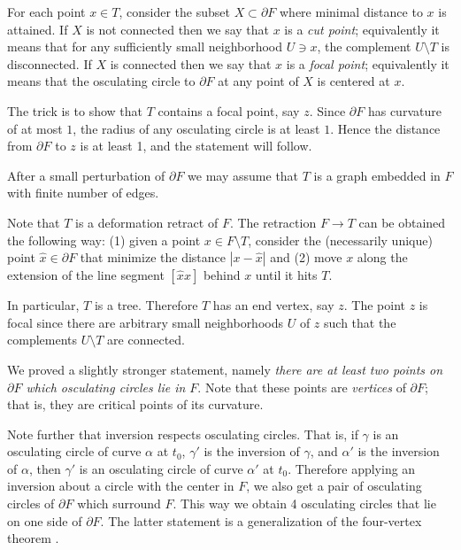 For each point $x\in T$, consider the subset $X\subset\partial F$ where minimal distance to $x$ is attained.
If $X$ is not connected then we say that $x$ is a \emph{cut point};
equivalently it means that for any sufficiently small neighborhood $U\ni x$, 
the complement $U\setminus T$ is disconnected.
If $X$ is connected 
then we say that $x$ is a \emph{focal point};
equivalently it means that the osculating circle to $\partial F$ at any point of $X$ is centered at $x$.

The trick is to show that $T$ contains a focal point, say $z$.
Since $\partial F$ has curvature of at most $1$, the radius of any osculating circle is at least $1$.
Hence the distance from $\partial F$ to $z$ is at least 1,
and the statement will follow.

\medskip

After a small perturbation
of $\partial F$ we may assume that
$T$ is a graph embedded in
$F$ with finite number of edges.

Note that $T$ is a
deformation retract of $F$.
The retraction $F\to T$ can be obtained the following way:
(1) given a point $x\in F\setminus T$,
consider the (necessarily unique) point $\hat x\in \partial F$ that minimize the distance $|x-\hat x|$ and
(2) move $x$ along the extension of the line segment $[\hat x x]$ behind $x$ until it hits $T$.

In particular, $T$ is a tree.
Therefore $T$ has
an end vertex, say $z$.
The point $z$ is focal since there are arbitrary small neighborhoods $U$ of $z$ such that the complements $U\setminus T$ are connected.
\qeds

We proved a slightly stronger statement, namely \textit{there are at least two points on $\partial F$ which osculating circles lie in $F$}.
Note that these points are \emph{vertices} of $\partial F$;
that is, they are critical points of its curvature.

Note further that inversion respects osculating circles.
That is, if $\gamma$ is an osculating circle of curve $\alpha$ at $t_0$,
$\gamma'$ is the inversion of $\gamma$, and 
$\alpha'$ is the inversion of $\alpha$,
then $\gamma'$ is an osculating circle of curve $\alpha'$ at $t_0$.
Therefore applying an inversion about a circle with the center in $F$, we also get a pair of osculating circles of $\partial F$ which surround $F$.
This way we obtain 4 osculating circles that lie on one side of $\partial F$.
The latter statement is a generalization of the four-vertex theorem \cite{petrunin-zamora:moon}.

